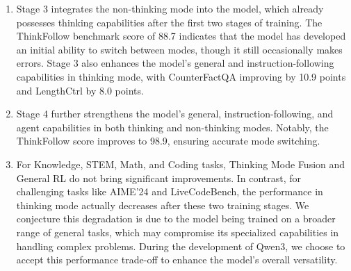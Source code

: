 \begin{enumerate}[label=(\arabic*)]
    \item Stage 3 integrates the non-thinking mode into the model, which already possesses thinking capabilities after the first two stages of training. The ThinkFollow benchmark score of 88.7 indicates that the model has developed an initial ability to switch between modes, though it still occasionally makes errors. Stage 3 also enhances the model's general and instruction-following capabilities in thinking mode, with CounterFactQA improving by 10.9 points and LengthCtrl by 8.0 points.
    
    \item Stage 4 further strengthens the model's general, instruction-following, and agent capabilities in both thinking and non-thinking modes. Notably, the ThinkFollow score improves to 98.9, ensuring accurate mode switching.
    
    \item For Knowledge, STEM, Math, and Coding tasks, Thinking Mode Fusion and General RL do not bring significant improvements. In contrast, for challenging tasks like AIME'24 and LiveCodeBench, the performance in thinking mode actually decreases after these two training stages. We conjecture this degradation is due to the model being trained on a broader range of general tasks, which may compromise its specialized capabilities in handling complex problems. During the development of Qwen3, we choose to accept this performance trade-off to enhance the model's overall versatility.
\end{enumerate}